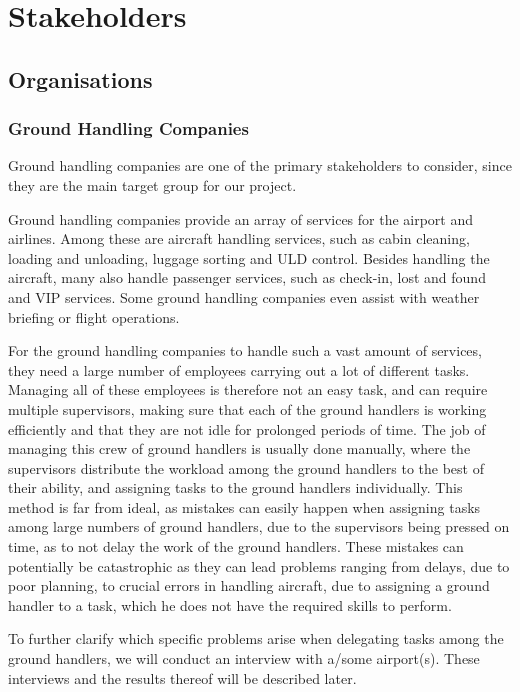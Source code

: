 \chapter{Stakeholders}
\section{Organisations}
\subsection{Ground Handling Companies}
Ground handling companies are one of the primary stakeholders to consider, since they are the main target group for our project.

Ground handling companies provide an array of services for the airport and airlines. Among these are aircraft handling services, such as cabin cleaning, loading and unloading, luggage sorting and ULD control. Besides handling the aircraft, many also handle passenger services, such as check-in, lost and found and VIP services. Some ground handling companies even assist with weather briefing or flight operations.

For the ground handling companies to handle such a vast amount of services, they need a large number of employees carrying out a lot of different tasks. Managing all of these employees is therefore not an easy task, and can require multiple supervisors, making sure that each of the ground handlers is working efficiently and that they are not idle for prolonged periods of time. The job of managing this crew of ground handlers is usually done manually, where the supervisors distribute the workload among the ground handlers to the best of their ability, and assigning tasks to the ground handlers individually.
This method is far from ideal, as mistakes can easily happen when assigning tasks among large numbers of ground handlers, due to the supervisors being pressed on time, as to not delay the work of the ground handlers. These mistakes can potentially be catastrophic as they can lead problems ranging from delays, due to poor planning, to crucial errors in handling aircraft, due to assigning a ground handler to a task, which he does not have the required skills to perform.

To further clarify which specific problems arise when delegating tasks among the ground handlers, we will conduct an interview with a/some airport(s). These interviews and the results thereof will be described later.
